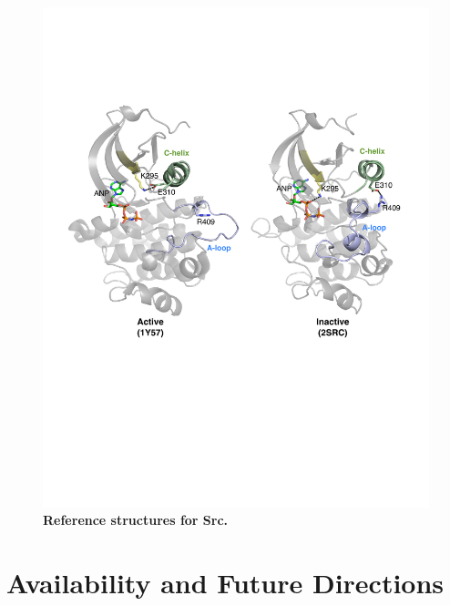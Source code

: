 \documentclass[aps,pre,twocolumn,nofootinbib,superscriptaddress,linenumbers]{revtex4-1}
\begin{document}
\begin{figure}[tb]
  \centering
    \includegraphics[width=1.0\textwidth]{residue_pair_distances/src/src_ref_structures}
    \caption{{\bf Reference structures for Src.}
  }
  \label{figsrc_ref_structures}
\end{figure}

\section{Availability and Future Directions}
\label{section:availability}

\end{document}
